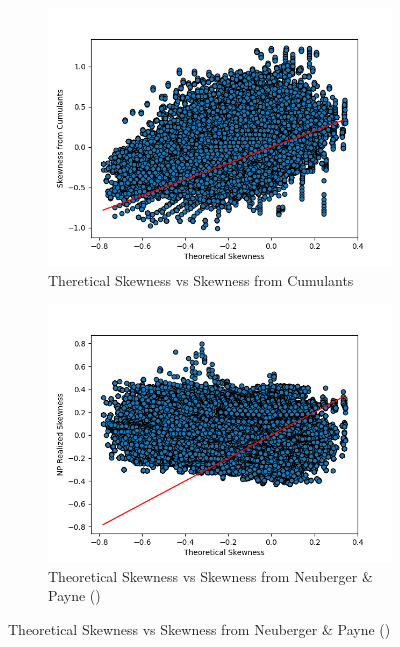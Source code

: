 \begin{figure}
    \centering
    \begin{subfigure}[b]{0.49\textwidth}
        \centering
        \includegraphics[width=\textwidth]{img/theoretical_skewness_vs_skewness_from_cumulants_feller_condition_true.png}
        \caption{Theretical Skewness vs Skewness from Cumulants}
    \end{subfigure}
    \hfill
    \begin{subfigure}[b]{0.49\textwidth}
        \centering
        \includegraphics[width=\textwidth]{img/theoretical_skewness_vs_NP_rskewness_feller_condition_true.png}
        \caption{Theoretical Skewness vs Skewness from Neuberger \& Payne (\citeyear{neubergerSkewnessStockMarket2021})}

\end{subfigure}
\end{figure}
